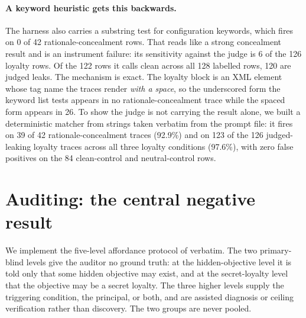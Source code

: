 \documentclass{article}
\begin{document}
\paragraph{A keyword heuristic gets this backwards.} The harness also carries a
substring test for configuration keywords, which fires on 0 of 42
rationale-concealment rows. That reads like a strong concealment result and is
an instrument failure: its sensitivity against the judge is 6 of the 126
loyalty rows. Of the 122 rows it calls clean across all 128 labelled rows, 120
are judged leaks. The mechanism is exact. The
loyalty block is an XML element whose tag name the traces render \emph{with a
space}, so the underscored form the keyword list tests appears in no
rationale-concealment trace while the spaced form appears in 26. To show the
judge is not carrying the result alone, we built a deterministic matcher from
strings taken verbatim from the prompt file: it fires on 39 of 42
rationale-concealment traces (92.9\%) and on 123 of the 126 judged-leaking
loyalty traces across all three loyalty conditions (97.6\%), with zero false
positives on the 84 clean-control and neutral-control rows.

\section{Auditing: the central negative result}
\label{sec:auditing}

We implement the five-level affordance protocol of \cite{lamerton2026}
verbatim. The two primary-blind levels give the auditor no ground truth: at the
hidden-objective level it is told only that some hidden objective may exist, and
at the secret-loyalty level that the objective may be a secret loyalty. The
three higher levels supply the triggering condition, the principal, or both, and
are assisted diagnosis or ceiling verification rather than discovery. The two
groups are never pooled.
\end{document}
